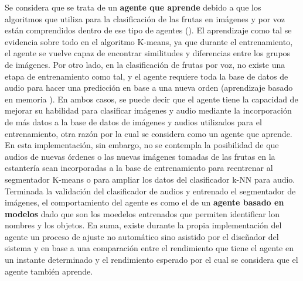 \documentclass[a4paper, 12pt]{article}
\begin{document}
Se considera que se trata de un \textbf{agente que aprende} debido a que los algoritmos que utiliza para la clasificación de las frutas en imágenes y por voz están comprendidos dentro de ese tipo de agentes (\cite{RusselNorvig2009}). El aprendizaje como tal se evidencia sobre todo en el algoritmo K-means, ya que durante el entrenamiento, el agente se vuelve capaz de encontrar similitudes y diferencias entre los grupos de imágenes. Por otro lado, en la clasificación de frutas por voz, no existe una etapa de entrenamiento como tal, y el agente requiere toda la base de datos de audio para hacer una predicción en base a una nueva orden (aprendizaje basado en memoria \cite{RussellNorvig2009}). En ambos casos, se puede decir que el agente tiene la capacidad de mejorar su habilidad para clasificar imágenes y audio mediante la incorporación de más datos a la base de datos de imágenes y audios utilizados para el entrenamiento, otra razón por la cual se considera como un agente que aprende. En esta implementación, sin embargo, no se contempla la posibilidad de que audios de nuevas órdenes o las nuevas imágenes tomadas de las frutas en la estantería sean incorporadas a la base de entrenamiento para reentrenar al segmentador K-means o para ampliar los datos del clasificador k-NN para audio. Terminada la validación del clasificador de audios y entrenado el segmentador de imágenes, el comportamiento del agente es como el de un \textbf{agente basado en modelos} dado que son los moedelos entrenados que permiten identificar lon nombres y los objetos. En suma, existe durante la propia implementación del agente un proceso de ajuste no automático sino asistido por el diseñador del sistema y en base a una comparación entre el rendimiento que tiene el agente en un instante determinado y el rendimiento esperado por el cual se considera que el agente también aprende.
\newpage
\end{document}
